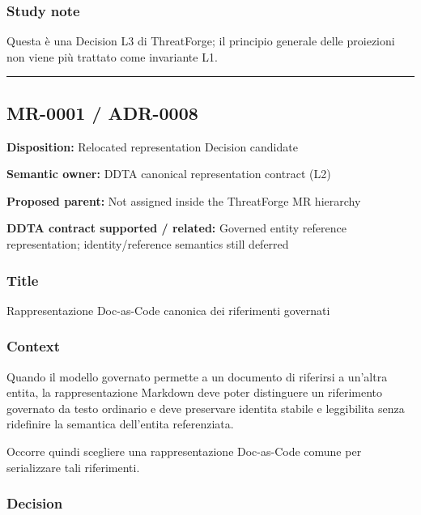 \documentclass[
  10pt,
  a4paper,
]{article}
\begin{document}
\subsubsection{Study note}\label{study-note-4}

Questa è una Decision L3 di ThreatForge; il principio generale delle
proiezioni non viene più trattato come invariante L1.

\begin{center}\rule{0.5\linewidth}{0.5pt}\end{center}

\subsection{MR-0001 / ADR-0008}\label{mr-0001-adr-0008}

\textbf{Disposition:} Relocated representation Decision candidate

\textbf{Semantic owner:} DDTA canonical representation contract (L2)

\textbf{Proposed parent:} Not assigned inside the ThreatForge MR
hierarchy

\textbf{DDTA contract supported / related:} Governed entity reference
representation; identity/reference semantics still deferred

\subsubsection{Title}\label{title-6}

Rappresentazione Doc-as-Code canonica dei riferimenti governati

\subsubsection{Context}\label{context-6}

Quando il modello governato permette a un documento di riferirsi a
un'altra entita, la rappresentazione Markdown deve poter distinguere un
riferimento governato da testo ordinario e deve preservare identita
stabile e leggibilita senza ridefinire la semantica dell'entita
referenziata.

Occorre quindi scegliere una rappresentazione Doc-as-Code comune per
serializzare tali riferimenti.

\subsubsection{Decision}\label{decision-6}
\end{document}
